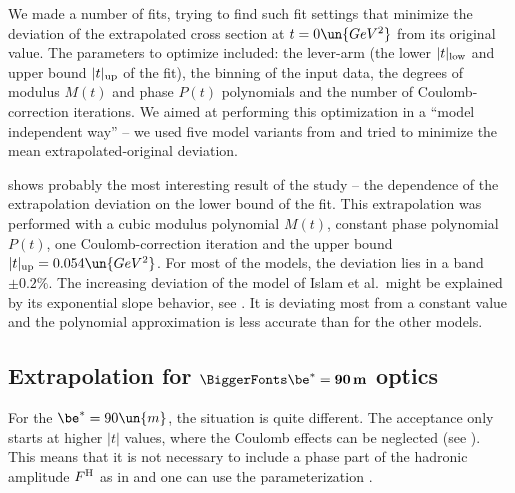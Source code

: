 We made a number of fits, trying to find such fit settings that minimize the deviation of the extrapolated cross section at $t=0\un{GeV^2}$ from its original value. The parameters to optimize included: the lever-arm (the lower $|t|_{\rm low}$ and upper bound $|t|_{\rm up}$ of the fit), the binning of the input data, the degrees of modulus $M(t)$ and phase $P(t)$ polynomials and the number of Coulomb-correction iterations. We aimed at performing this optimization in a ``model independent way'' -- we used five model variants from  and tried to minimize the mean extrapolated-original deviation.


 shows probably the most interesting result of the study -- the dependence of the extrapolation deviation on the lower bound of the fit. This extrapolation was performed with a cubic modulus polynomial $M(t)$, constant phase polynomial $P(t)$, one Coulomb-correction iteration and the upper bound $|t|_{\rm up} = 0.054\un{GeV^2}$. For most of the models, the deviation lies in a band $\pm 0.2\percent$. The increasing deviation of the model of Islam et al.~might be explained by its exponential slope behavior, see . It is deviating most from a constant value and the polynomial approximation is less accurate than for the other models.




\def\OutlineLabel{Extrapolation for beta* = 90 m optics}
\def\TOCLabel{Extrapolation for $\be^* = 90$ m optics}
\subsection{Extrapolation for $\BiggerFonts\mathbf{\be^* = 90\,m}$ optics}

For the $\be^* = 90\un{m}$, the situation is quite different. The acceptance only starts at higher $|t|$ values, where the Coulomb effects can be neglected (see ). This means that it is not necessary to include a phase part of the hadronic amplitude $F^{\rm H}$ as in  and one can use the parameterization . 

